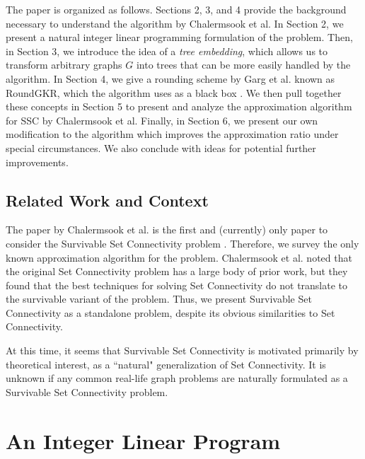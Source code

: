 \documentclass[12pt]{article}
\begin{document}
The paper is organized as follows. Sections 2, 3, and 4 provide the background necessary to understand the algorithm by Chalermsook et al. In Section 2, we present a natural integer linear programming formulation of the problem. Then, in Section 3, we introduce the idea of a \emph{tree embedding}, which allows us to transform arbitrary graphs $G$ into trees that can be more easily handled by the algorithm. In Section 4, we give a rounding scheme by Garg et al. known as RoundGKR, which the algorithm uses as a black box \cite{GKR}. We then pull together these concepts in Section 5 to present and analyze the approximation algorithm for SSC by Chalermsook et al. Finally, in Section 6, we present our own modification to the algorithm which improves the approximation ratio under special circumstances. We also conclude with ideas for potential further improvements.

\subsection{Related Work and Context}

The paper by Chalermsook et al. is the first and (currently) only paper to consider the Survivable Set Connectivity problem \cite{ssc}. Therefore, we survey the only known approximation algorithm for the problem. Chalermsook et al. noted that the original Set Connectivity problem has a large body of prior work, but they found that the best techniques for solving Set Connectivity do not translate to the survivable variant of the problem. Thus, we present Survivable Set Connectivity as a standalone problem, despite its obvious similarities to Set Connectivity.

At this time, it seems that Survivable Set Connectivity is motivated primarily by theoretical interest, as a ``natural" generalization of Set Connectivity. It is unknown if any common real-life graph problems are naturally formulated as a Survivable Set Connectivity problem.

\section{An Integer Linear Program}
\end{document}
